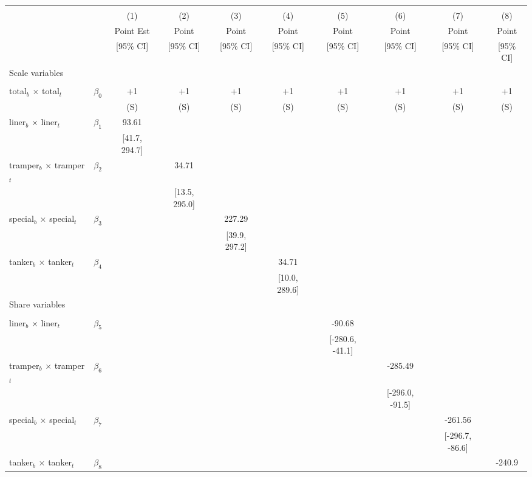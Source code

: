\begin{tabular}{@{\extracolsep{5pt}}lccccccccc}
\toprule 
 &  &  &  &  &  &  &  &  &  \\
 &  & (1) & (2) & (3) & (4) & (5) & (6) & (7) & (8) \\
 &  & Point Est & Point & Point & Point & Point & Point & Point & Point \\
 &  & [95\% CI] & [95\% CI] & [95\% CI] & [95\% CI] & [95\% CI] & [95\% CI] & [95\% CI] & [95\% CI] \\
\midrule 
Scale variables &  &  &  &  &  &  &  \\
 &  &  &  &  &  &  &  &  \\
total$_{b}$ $\times$ total$_{t}$ & $\beta_0$ & +1 & +1 & +1 & +1 & +1 & +1 & +1 & +1 \\
 &  & (S) & (S) & (S) & (S) & (S) & (S) & (S) & (S) \\
liner$_{b}$ $\times$ liner$_{t}$ & $\beta_1$ & 93.61 &  &  &  &  &  &  &  \\
 &  & [41.7, 294.7] &  &  &  &  &  &  &  \\
tramper$_{b}$ $\times$ tramper$_{t}$ & $\beta_2$ &  & 34.71 &  &  &  &  &  &  \\
 &  &  & [13.5, 295.0] &  &  &  &  &  &  \\
special$_{b}$ $\times$ special$_{t}$ & $\beta_3$ &  &  & 227.29 &  &  &  &  &  \\
 &  &  &  & [39.9, 297.2] &  &  &  &  &  \\
tanker$_{b}$ $\times$ tanker$_{t}$ & $\beta_4$ &  &  &  & 34.71 &  &  &  &  \\
 &  &  &  &  & [10.0, 289.6] &  &  &  &  \\
Share variables &  &  &  &  &  &  &  &  &  \\
 &  &  &  &  &  &  &  &  &  \\
liner$_{b}$ $\times$ liner$_{t}$ & $\beta_5$ &  &  &  &  & -90.68 &  &  &  \\
 &  &  &  &  &  & [-280.6, -41.1] &  &  &  \\
tramper$_{b}$ $\times$ tramper$_{t}$ & $\beta_6$ &  &  &  &  &  & -285.49 &  &  \\
 &  &  &  &  &  &  & [-296.0, -91.5] &  &  \\
special$_{b}$ $\times$ special$_{t}$ & $\beta_7$ &  &  &  &  &  &  & -261.56 &  \\
 &  &  &  &  &  &  &  & [-296.7, -86.6] &  \\
tanker$_{b}$ $\times$ tanker$_{t}$ & $\beta_8$ &  &  &  &  &  &  &  & -240.9 \\

\end{tabular}
